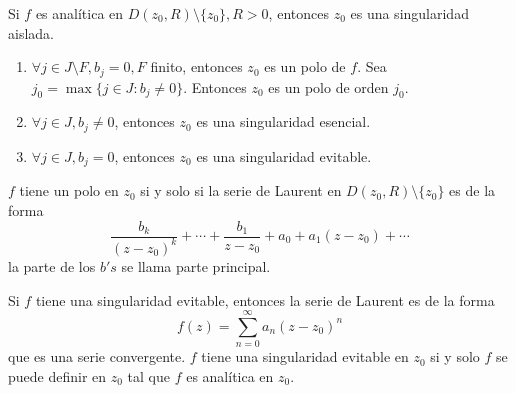 \begin{defn}
  Si $f$ es analítica en $D(z_{0}, R) \setminus \{  z_{0} \}, R > 0$, entonces $z_{0}$ es una singularidad aislada.
  \begin{enumerate}[label=(\roman*)]
    \item $\forall j \in J \setminus F, b_{j} = 0, F$ finito, entonces $z_{0}$ es un polo de $f$. Sea $j_{0} = \max \{ j \in J : b_{j} \neq 0\}$. Entonces $z_{0}$ es un polo de orden $j_{0}$.
    \item $\forall j \in J, b_{j} \neq 0$, entonces $z_{0}$ es una singularidad esencial.
    \item $\forall j \in J, b_{j} = 0$, entonces $z_{0}$ es una singularidad evitable. 
  \end{enumerate}
\end{defn}

\begin{obs}
  $f$ tiene un polo en $z_{0}$ si y solo si la serie de Laurent en $D(z_{0}, R) \setminus \{ z_{0} \}$ es de la forma
  \[ 
    \frac{b_{k}}{(z - z_{0})^{k}} + \cdots + \frac{b_{1}}{z - z_{0}} + a_{0} + a_{1}(z - z_{0}) + \cdots 
  \] 
  la parte de los $b's$ se llama parte principal.
\end{obs}

\begin{obs}
  Si $f$ tiene una singularidad evitable, entonces la serie de Laurent es de la forma
  \[ 
    f(z) = \sum_{n = 0}^{\infty} a_{n}(z - z_{0})^{n} 
  \] 
  que es una serie convergente. $f$ tiene una singularidad evitable en $z_{0}$ si y solo $f$ se puede definir en $z_{0}$ tal que $f$ es analítica en $z_{0}$.
\end{obs}

